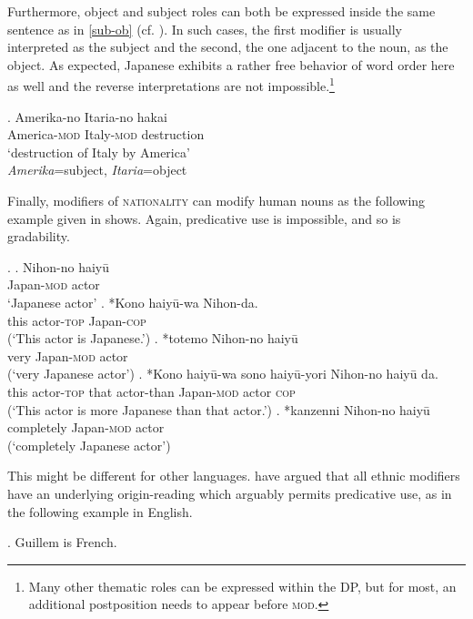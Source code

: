 \documentclass [output=book,colorlinks,citecolor=brown]{langscibook}
\begin{document}
Furthermore, object and subject roles can both be expressed inside the same sentence as in \ref{sub-ob} (cf. \citealt{murasugi:1991:noun}). In such cases, the first modifier is usually interpreted as the subject and the second, the one adjacent to the noun, as the object. As expected, Japanese exhibits a rather free behavior of word order here as well and the reverse interpretations are not impossible.\footnote{Many other thematic roles can be expressed within the DP, but for most, an additional postposition needs to appear before \textsc{mod}.} %

\exg. Amerika-no Itaria-no hakai \label{sub-ob}\\
America-\textsc{mod} Italy-\textsc{mod} destruction\\
`destruction of Italy by America’ \\ \null \hfill \textit{Amerika}=subject, \textit{Itaria}=object

Finally, modifiers of \textsc{nationality} can modify human nouns as the following example given in \citet[91]{morita:2011:three} shows. Again, predicative use is impossible, and so is gradability.

\newpage

\ex. \ag. Nihon-no haiyū\\
Japan-\textsc{mod} actor\\
`Japanese actor'
\bg. *Kono haiyū-wa Nihon-da.\\
this actor-\textsc{top} Japan-\textsc{cop}\\
(`This actor is Japanese.’)
\cg. *totemo Nihon-no haiyū\\
very Japan-\textsc{mod} actor\\
(`very Japanese actor’)
\dg. *Kono haiyū-wa sono haiyū-yori Nihon-no haiyū da.\\
this actor-\textsc{top} that actor-than Japan-\textsc{mod} actor \textsc{cop}\\
(`This actor is more Japanese than that actor.’)
\eg. *kanzenni Nihon-no haiyū\\
completely Japan-\textsc{mod} actor\\
(`completely Japanese actor’)

This might be different for other languages. \citet{arseni:2014:EA} have argued that all ethnic modifiers have an underlying origin-reading which arguably permits predicative use, as in the following example in English.

\ex. Guillem is French. \hfill \citep[23]{arseni:2014:EA}
\end{document}
